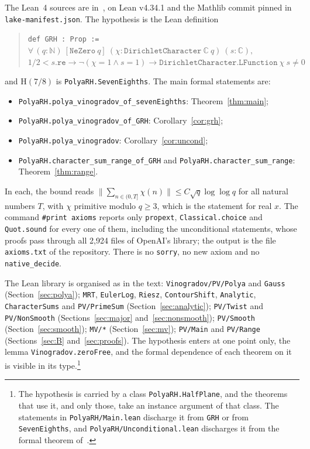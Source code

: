 \documentclass[11pt]{amsart}
\theoremstyle{definition}
\theoremstyle{remark}
\numberwithin{equation}{section}
\begin{document}
The Lean~4 sources are in~\cite{repo}, on Lean v4.34.1 and the Mathlib commit
pinned in \texttt{lake-manifest.json}. The hypothesis is the Lean definition
\begin{quote}\small
\texttt{def GRH : Prop :=}
$\forall\,(q:\mathbb N)\ [\texttt{NeZero}\ q]\ (\chi:\texttt{DirichletCharacter}\ \mathbb C\ q)\ (s:\mathbb C),$\\
\hspace*{2em}$1/2<s.\texttt{re}\to\lnot(\chi=1\wedge s=1)\to\texttt{DirichletCharacter.LFunction}\ \chi\ s\ne0$
\end{quote}
and $\mathrm H(7/8)$ is \texttt{PolyaRH.SevenEighths}. The main formal statements are:
\begin{itemize}
\item \texttt{PolyaRH.polya\_vinogradov\_of\_sevenEighths}: Theorem~\ref{thm:main};
\item \texttt{PolyaRH.polya\_vinogradov\_of\_GRH}: Corollary~\ref{cor:grh};
\item \texttt{PolyaRH.polya\_vinogradov}: Corollary~\ref{cor:uncond};
\item \texttt{PolyaRH.character\_sum\_range\_of\_GRH} and \texttt{PolyaRH.character\_sum\_range}: Theorem~\ref{thm:range}.
\end{itemize}
In each, the bound reads $\|\sum_{n\in(0,T]}\chi(n)\|\le C\sqrt q\log\log q$ for all
natural numbers $T$, with $\chi$ primitive modulo $q\ge3$, which is the statement
for real $x$. The command \texttt{\#print axioms} reports only
\texttt{propext}, \texttt{Classical.choice} and \texttt{Quot.sound} for every
one of them, including the unconditional statements, whose proofs pass through
all 2,924 files of OpenAI's library; the output is the file \texttt{axioms.txt}
of the repository. There is no \texttt{sorry}, no new axiom and no
\texttt{native\_decide}.

The Lean library is organised as in the text: \texttt{Vinogradov/PV/Polya} and
\texttt{Gauss} (Section~\ref{sec:polya}); \texttt{MRT}, \texttt{EulerLog},
\texttt{Riesz}, \texttt{ContourShift}, \texttt{Analytic},
\texttt{CharacterSums} and \texttt{PV/PrimeSum} (Section~\ref{sec:analytic});
\texttt{PV/Twist} and \texttt{PV/NonSmooth} (Sections~\ref{sec:major}
and~\ref{sec:nonsmooth}); \texttt{PV/Smooth} (Section~\ref{sec:smooth});
\texttt{MV/*} (Section~\ref{sec:mv}); \texttt{PV/Main} and \texttt{PV/Range}
(Sections~\ref{sec:B} and~\ref{sec:proofs}). The hypothesis enters at one
point only, the lemma \texttt{Vinogradov.zeroFree}, and the formal
dependence of each theorem on it is visible in its type.\footnote{The
hypothesis is carried by a class \texttt{PolyaRH.HalfPlane}, and the theorems
that use it, and only those, take an instance argument of that class. The
statements in \texttt{PolyaRH/Main.lean} discharge it from \texttt{GRH} or from
\texttt{SevenEighths}, and \texttt{PolyaRH/Unconditional.lean} discharges it from
the formal theorem of~\cite{openai}.}
\end{document}
